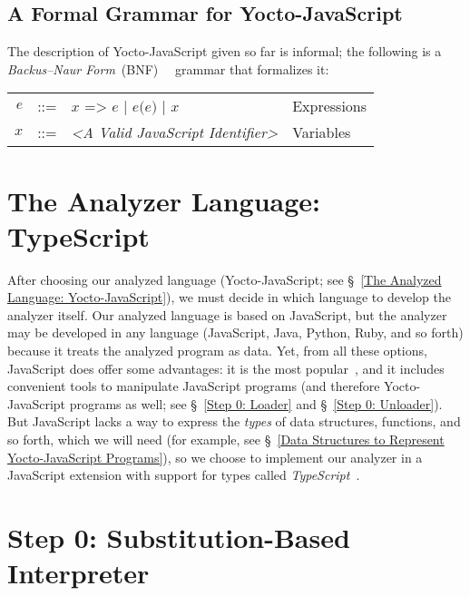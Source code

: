 \documentclass[12pt, oneside]{book}
\begin{document}
\begin{mdframed}[frametitle = {Advanced}]
\subsection{A Formal Grammar for Yocto-JavaScript}
\label{A Formal Grammar for Yocto-JavaScript}

The description of Yocto-JavaScript given so far is informal; the following is a \emph{Backus–Naur Form}~(BNF)~\cite{bnf}~\cite[§~4.2]{dragon-book} grammar that formalizes it:

\begin{center}
\begin{tabular}{rcll}
$e$ & ::= & $x\texttt{ => }e$ | $e\texttt{(}e\texttt{)}$ | $x$ & Expressions \\
$x$ & ::= & \emph{<A Valid JavaScript Identifier>} & Variables \\
\end{tabular}
\end{center}

\end{mdframed}

\section{The Analyzer Language: TypeScript}
\label{The Analyzer Language: TypeScript}

After choosing our analyzed language (Yocto-JavaScript; see §~\ref{The Analyzed Language: Yocto-JavaScript}), we must decide in which language to develop the analyzer itself. Our analyzed language is based on JavaScript, but the analyzer may be developed in any language (JavaScript, Java, Python, Ruby, and so forth) because it treats the analyzed program as data. Yet, from all these options, JavaScript does offer some advantages: it is the most popular~\cite{stack-overflow-developer-survey, jet-brains-developer-survey}, and it includes convenient tools to manipulate JavaScript programs (and therefore Yocto-JavaScript programs as well; see §~\ref{Step 0: Loader} and §~\ref{Step 0: Unloader}). But JavaScript lacks a way to express the \emph{types} of data structures, functions, and so forth, which we will need (for example, see §~\ref{Data Structures to Represent Yocto-JavaScript Programs}), so we choose to implement our analyzer in a JavaScript extension with support for types called \emph{TypeScript}~\cite{typescript, typescript-deep-dive, understanding-typescript}.

\section{Step 0: Substitution-Based Interpreter}
\label{Step 0: Substitution-Based Interpreter}
\end{document}
